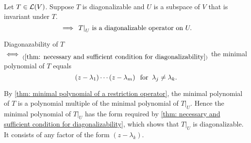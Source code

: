 \setcounter{thm}{64}
\begin{thm}
  \label{thm: restriction of diagonalizable operator to invariant subspace}
  Let $T\in \mathcal{L}(V)$. Suppose $T$ is diagonalizable and $U$ is a subspace of $V$ that is invariant under $T$.
  \begin{equation}
    \implies$ $\left.T\right|_U$ is a diagonalizable operator on $U.
  \end{equation}
\end{thm}
\begin{prf}
  Diagonazability of $T$ $\iff_{(\ref{thm: necessary and sufficient condition for diagonalizability})}$ the minimal polynomial of $T$ equals
  \begin{equation}
    (z-\lambda_1)\cdots(z-\lambda_m) \;\;\, \text{for}\;\; \lambda_j \neq  \lambda_k.
  \end{equation}

  By \ref{thm: minimal polynomial of a restriction operator}, the minimal polynomial of $T$ is a polynomial multiple of the minimal polynomial of $\left.T\right|_U$.
  Hence the minimal polynomial of $\left.T\right|_U$  has the form required by \ref{thm: necessary and sufficient condition for diagonalizability}, which shows that $\left.T\right|_U$ is diagonalizable. It consists of any factor of the form $(z-\lambda_k)$.
\end{prf}



